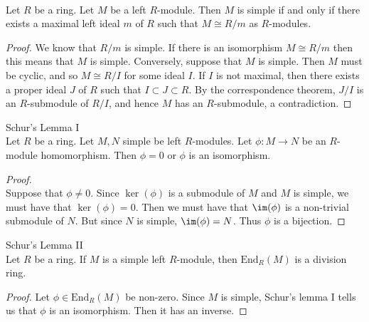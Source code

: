 \documentclass[a4paper]{article}
\begin{document}
\begin{prp}{}{}\\
Let $R$ be a ring. Let $M$ be a left $R$-module. Then $M$ is simple if and only if there exists a maximal left ideal $m$ of $R$ such that $M\cong R/m$ as $R$-modules. 
\begin{proof}
We know that $R/m$ is simple. If there is an isomorphism $M\cong R/m$ then this means that $M$ is simple. Conversely, suppose that $M$ is simple. Then $M$ must be cyclic, and so $M\cong R/I$ for some ideal $I$. If $I$ is not maximal, then there exists a proper ideal $J$ of $R$ such that $I\subset J\subset R$. By the correspondence theorem, $J/I$ is an $R$-submodule of $R/I$, and hence $M$ has an $R$-submodule, a contradiction. 
\end{proof}
\end{prp}

\begin{prp}{Schur's Lemma I}{}\\
Let $R$ be a ring. Let $M,N$ simple be left $R$-modules. Let $\phi:M\to N$ be an $R$-module homomorphism. Then $\phi=0$ or $\phi$ is an isomorphism. 
\begin{proof}\\
Suppose that $\phi\neq 0$. Since $\ker(\phi)$ is a submodule of $M$ and $M$ is simple, we must have that $\ker(\phi)=0$. Then we must have that $\im(\phi)$ is a non-trivial submodule of $N$. But since $N$ is simple, $\im(\phi)=N$. Thus $\phi$ is a bijection. 
\end{proof}
\end{prp}

\begin{crl}{Schur's Lemma II}{}\\
Let $R$ be a ring. If $M$ is a simple left $R$-module, then $\text{End}_R(M)$ is a division ring. 
\begin{proof}
Let $\phi\in\text{End}_R(M)$ be non-zero. Since $M$ is simple, Schur's lemma I tells us that $\phi$ is an isomorphism. Then it has an inverse. 
\end{proof}
\end{crl}
\end{document}
